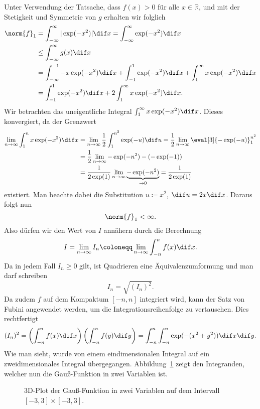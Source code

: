\documentclass{scrartcl}
\newcommand{\R}{\mathbb{R}}
\begin{document}
Unter Verwendung der Tatsache, dass $ f(x) > 0 $ für alle $ x \in \R $, und mit der Stetigkeit und 
Symmetrie von $ g $ erhalten wir folglich
\begin{align*}
   \norm{f}_{1} 
&= \int_{-\infty}^{\infty} |\exp(-x^{2})| \dif x
 = \int_{-\infty}^{\infty} \exp(-x^{2}) \dif x \\
&\leq \int_{-\infty}^{\infty} g(x) \dif x \\
&= \int_{-\infty}^{-1} -x \exp(-x^{2}) \dif x 
   + \int_{-1}^{1} \exp(-x^{2}) \dif x
   + \int_{1}^{\infty} x \exp(-x^{2}) \dif x \\
&= \int_{-1}^{1} \exp(-x^{2}) \dif x + 2 \int_{1}^{\infty} x \exp(-x^{2}) \dif x.
\end{align*}
Wir betrachten das uneigentliche Integral $ \int_{1}^{\infty} x \exp(-x^{2}) \dif x $.
Dieses konvergiert, da der Grenzwert
\begin{align*}
   \lim\limits_{n \to \infty} \int_{1}^{n} x \exp(-x^{2}) \dif x
&= \lim\limits_{n \to \infty} \frac{1}{2} \int_{1}^{n^{2}} \exp(-u) \dif u
 = \frac{1}{2} \lim\limits_{n \to \infty} \eval[3]{-\exp(-u)}_{1}^{n^{2}} \\
&= \frac{1}{2} \lim\limits_{n \to \infty} - \exp(-n^{2}) - (-\exp(-1)) \\
&= \frac{1}{2\exp(1)} \lim\limits_{n \to \infty} \underbrace{-\exp(-n^{2})}_{\to 0}
 = \frac{1}{2\exp(1)}
\end{align*}
existiert. Man beachte dabei die Substitution $ u \coloneqq x^{2} $, $ \dif u = 2x \dif x $. Daraus
folgt nun
\[
  \norm{f}_{1} < \infty.
\]
Also dürfen wir den Wert von $ I $ annähern durch die Berechnung
\[
  I = \lim\limits_{n \to \infty} I_{n} \coloneqq 
  \lim\limits_{n \to \infty} \int_{-n}^{n} f(x) \dif x.
\]
Da in jedem Fall $ I_{n} \geq 0 $ gilt, ist Quadrieren eine Äquivalenzumformung und man darf 
schreiben
\[
  I_{n} = \sqrt{ (I_{n})^{2} }.
\]
Da zudem $ f $ auf dem Kompaktum $ [-n, n] $ integriert wird, kann der Satz von Fubini angewendet
werden, um die Integrationsreihenfolge zu vertauschen. Dies rechtfertigt
\[
  (I_{n})^{2}
= \left( \int_{-n}^{n} f(x) \dif x \right) \left( \int_{-n}^{n} f(y) \dif y \right)
= \int_{-n}^{n} \int_{-n}^{n} \exp(-(x^{2} + y^{2})) \dif x \dif y.
\]
Wie man sieht, wurde von einem eindimensionalen Integral auf ein zweidimensionales Integral 
übergegangen. Abbildung~\ref{fig:gaussian3d} zeigt den Integranden, welcher nun die Gauß-Funktion
in zwei Variablen ist.
\begin{figure}[ht]
\centering
{}
\caption{3D-Plot der Gauß-Funktion in zwei Variablen auf dem Intervall $ [-3,3] \times [-3,3] $.}
\label{fig:gaussian3d}
\end{figure}
\end{document}
